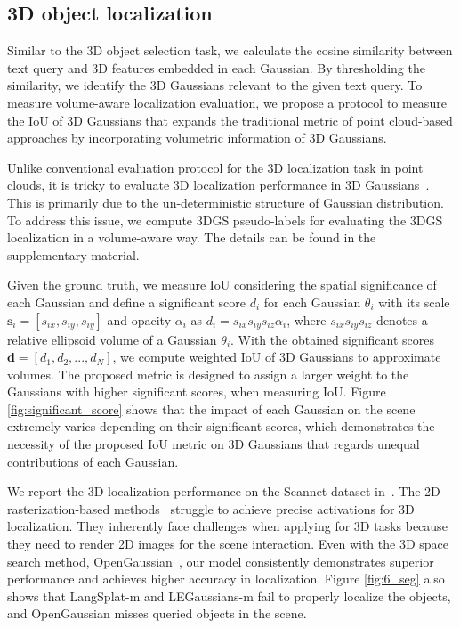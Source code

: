 \subsection{3D object localization}
\label{subsec:5_2}

Similar to the 3D object selection task, we calculate the cosine similarity between text query and 3D features embedded in each Gaussian. By thresholding the similarity, we identify the 3D Gaussians relevant to the given text query. To measure volume-aware localization evaluation, we propose a protocol to measure the IoU of 3D Gaussians that expands the traditional metric of point cloud-based approaches by incorporating volumetric information of 3D Gaussians.

Unlike conventional evaluation protocol for the 3D localization task in point clouds, it is tricky to evaluate 3D localization performance in 3D Gaussians~\cite{3dgs}. This is primarily due to the un-deterministic structure of Gaussian distribution. To address this issue, we compute 3DGS pseudo-labels for evaluating the 3DGS localization in a volume-aware way. The details can be found in the supplementary material.

Given the ground truth, we measure IoU considering the spatial significance of each Gaussian and define a significant score $d_{i}$ for each Gaussian $\theta_i$ with its scale $\mathbf{s}_i = [s_{ix}, s_{iy}, s_{iy}]$ and opacity $\alpha_i$ as $d_{i} = s_{ix}s_{iy}s_{iz} \alpha_i$, where $s_{ix}s_{iy}s_{iz}$ denotes a relative ellipsoid volume of a Gaussian $\theta_i$. With the obtained significant scores $\mathbf{d}=[d_1, d_2, ..., d_{N}]$, we compute weighted IoU of 3D Gaussians to approximate volumes. 
The proposed metric is designed to assign a larger weight to the Gaussians with higher significant scores, when measuring IoU. Figure \ref{fig:significant_score} shows that the impact of each Gaussian on the scene extremely varies depending on their significant scores, which demonstrates the necessity of the proposed IoU metric on 3D Gaussians that regards unequal contributions of each Gaussian. 

We report the 3D localization performance on the Scannet dataset in~. 
The 2D rasterization-based methods~\cite{langsplat, legaussian} struggle to achieve precise activations for 3D localization.
They inherently face challenges when applying for 3D tasks because they need to render 2D images for the scene interaction.
Even with the 3D space search method, OpenGaussian~\cite{open_gaussian}, our model consistently demonstrates superior performance and achieves higher accuracy in localization. 
Figure \ref{fig:6_seg} also shows that LangSplat-m and LEGaussians-m fail to properly localize the objects, and OpenGaussian misses queried objects in the scene.
